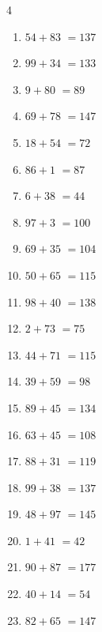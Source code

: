 \begin{multicols}{4}
\begin{enumerate}
  \item $54+83$
        $=137$

  \item $99+34$
        $=133$

  \item $9+80$
        $=89$

  \item $69+78$
        $=147$

  \item $18+54$
        $=72$

  \item $86+1$
        $=87$

  \item $6+38$
        $=44$

  \item $97+3$
        $=100$

  \item $69+35$
        $=104$

  \item $50+65$
        $=115$

\columnbreak %

  \item $98+40$
        $=138$

  \item $2+73$
        $=75$

  \item $44+71$
        $=115$

  \item $39+59$
        $=98$

  \item $89+45$
        $=134$

  \item $63+45$
        $=108$

  \item $88+31$
        $=119$

  \item $99+38$
        $=137$

  \item $48+97$
        $=145$

  \item $1+41$
        $=42$

  \item $90+87$
        $=177$

  \item $40+14$
        $=54$

  \item $82+65$
        $=147$


\end{enumerate}
\end{multicols}
